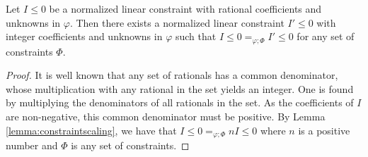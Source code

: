 \begin{lemma}\label{lemma:constraintcommonden}
Let $I \leq 0$ be a normalized linear constraint with rational coefficients and unknowns in $\varphi$. Then there exists a normalized linear constraint $I' \leq 0$ with integer coefficients and unknowns in $\varphi$ such that $I \leq 0 =_{\varphi;\Phi} I' \leq 0$ for any set of constraints $\Phi$.%
\begin{proof}
    It is well known that any set of rationals has a common denominator, whose multiplication with any rational in the set yields an integer. One is found by multiplying the denominators of all rationals in the set. As the coefficients of $I$ are non-negative, this common denominator must be positive. By Lemma \ref{lemma:constraintscaling}, we have that $I\leq 0 =_{\varphi;\Phi} n I \leq 0$ where $n$ is a positive number and $\Phi$ is any set of constraints.%
\end{proof}
\end{lemma}